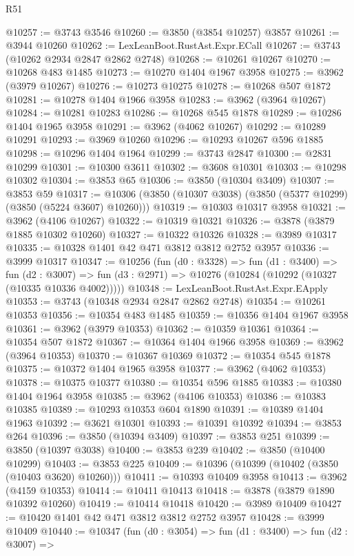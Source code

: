 \begin{lexlean}{R51}
\begin{coremodule}
@10257 := @3743 @3546
@10260 := @3850 (@3854 @10257) @3857
@10261 := @3944 @10260
@10262 := LexLeanBoot.RustAst.Expr.ECall
@10267 := @3743 (@10262 @2934 @2847 @2862 @2748)
@10268 := @10261 @10267
@10270 := @10268 @483 @1485
@10273 := @10270 @1404 @1967 @3958
@10275 := @3962 (@3979 @10267)
@10276 := @10273 @10275
@10278 := @10268 @507 @1872
@10281 := @10278 @1404 @1966 @3958
@10283 := @3962 (@3964 @10267)
@10284 := @10281 @10283
@10286 := @10268 @545 @1878
@10289 := @10286 @1404 @1965 @3958
@10291 := @3962 (@4062 @10267)
@10292 := @10289 @10291
@10293 := @3969 @10260
@10296 := @10293 @10267 @596 @1885
@10298 := @10296 @1404 @1964
@10299 := @3743 @2847
@10300 := @2831 @10299
@10301 := @10300 @3611
@10302 := @3608 @10301
@10303 := @10298 @10302
@10304 := @3853 @65
@10306 := @3850 (@10304 @3409)
@10307 := @3853 @59
@10317 := @10306 (@3850 (@10307 @3038) (@3850 (@5377 @10299) (@3850 (@5224 @3607) @10260)))
@10319 := @10303 @10317 @3958
@10321 := @3962 (@4106 @10267)
@10322 := @10319 @10321
@10326 := @3878 (@3879 @1885 @10302 @10260)
@10327 := @10322 @10326
@10328 := @3989 @10317
@10335 := @10328 @1401 @42 @471 @3812 @3812 @2752 @3957
@10336 := @3999 @10317
@10347 := @10256
    (fun (d0 : @3328) =>
    fun (d1 : @3400) =>
    fun (d2 : @3007) => fun (d3 : @2971) => @10276 (@10284 (@10292 (@10327 (@10335 @10336 @4002)))))
@10348 := LexLeanBoot.RustAst.Expr.EApply
@10353 := @3743 (@10348 @2934 @2847 @2862 @2748)
@10354 := @10261 @10353
@10356 := @10354 @483 @1485
@10359 := @10356 @1404 @1967 @3958
@10361 := @3962 (@3979 @10353)
@10362 := @10359 @10361
@10364 := @10354 @507 @1872
@10367 := @10364 @1404 @1966 @3958
@10369 := @3962 (@3964 @10353)
@10370 := @10367 @10369
@10372 := @10354 @545 @1878
@10375 := @10372 @1404 @1965 @3958
@10377 := @3962 (@4062 @10353)
@10378 := @10375 @10377
@10380 := @10354 @596 @1885
@10383 := @10380 @1404 @1964 @3958
@10385 := @3962 (@4106 @10353)
@10386 := @10383 @10385
@10389 := @10293 @10353 @604 @1890
@10391 := @10389 @1404 @1963
@10392 := @3621 @10301
@10393 := @10391 @10392
@10394 := @3853 @264
@10396 := @3850 (@10394 @3409)
@10397 := @3853 @251
@10399 := @3850 (@10397 @3038)
@10400 := @3853 @239
@10402 := @3850 (@10400 @10299)
@10403 := @3853 @225
@10409 := @10396 (@10399 (@10402 (@3850 (@10403 @3620) @10260)))
@10411 := @10393 @10409 @3958
@10413 := @3962 (@4159 @10353)
@10414 := @10411 @10413
@10418 := @3878 (@3879 @1890 @10392 @10260)
@10419 := @10414 @10418
@10420 := @3989 @10409
@10427 := @10420 @1401 @42 @471 @3812 @3812 @2752 @3957
@10428 := @3999 @10409
@10440 := @10347
    (fun (d0 : @3054) =>
    fun (d1 : @3400) =>
    fun (d2 : @3007) =>

\end{coremodule}
\end{lexlean}
